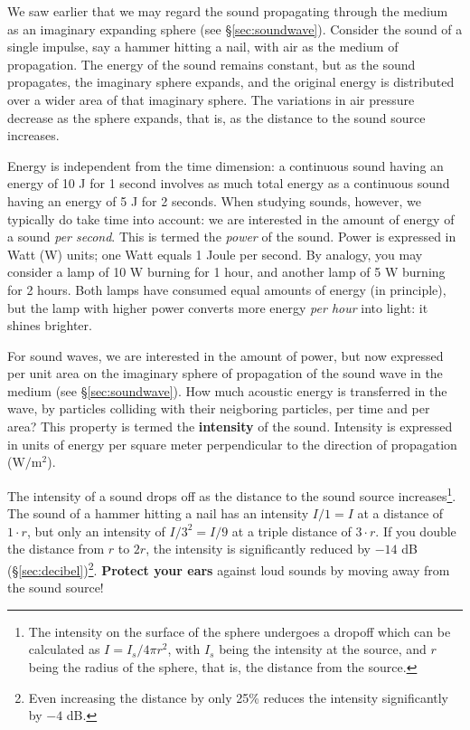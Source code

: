 \documentclass[
]{book}
\begin{document}
We saw earlier that we may regard the sound propagating through the medium as an imaginary expanding sphere (see §\ref{sec:soundwave}). Consider the sound of a single impulse, say a hammer hitting a nail, with air as the medium of propagation. The energy of the sound remains constant, but as the sound propagates, the imaginary sphere expands, and the original energy is distributed over a wider area of that imaginary sphere. The variations in air pressure decrease as the sphere expands, that is, as the distance to the sound source increases.

Energy is independent from the time dimension: a continuous sound having an energy of 10 J for 1 second involves as much total energy as a continuous sound having an energy of 5 J for 2 seconds. When studying sounds, however, we typically do take time into account: we are interested in the amount of energy of a sound \emph{per second}. This is termed the \emph{power} of the sound. Power is expressed in Watt (W) units; one Watt equals 1 Joule per second. By analogy, you may consider a lamp of 10 W burning for 1 hour, and another lamp of 5 W burning for 2 hours. Both lamps have consumed equal amounts of energy (in principle), but the lamp with higher power converts more energy \emph{per hour} into light: it shines brighter.

For sound waves, we are interested in the amount of power, but now expressed per unit area on the imaginary sphere of propagation of the sound wave in the medium (see §\ref{sec:soundwave}). How much acoustic energy is transferred in the wave, by particles colliding with their neigboring particles, per time and per area? This property is termed the \textbf{intensity} of the sound. Intensity is expressed in units of energy per square meter perpendicular to the direction of propagation (\(\textrm{W}/\textrm{m}^2\)).

The intensity of a sound drops off as the distance to the sound source increases\footnote{The intensity on the surface of the sphere undergoes a dropoff which can be calculated as \(I=I_s/4πr^2\), with \(I_s\) being the intensity at the source, and \(r\) being the radius of the sphere, that is, the distance from the source.}. The sound of a hammer hitting a nail has an intensity \(I/1 = I\) at a distance of \(1 \cdot r\), but only an intensity of \(I /3^2 = I/9\) at a triple distance of \(3 \cdot r\). If you double the distance from \(r\) to \(2r\), the intensity is significantly reduced by \(-14\) dB (§\ref{sec:decibel})\footnote{Even increasing the distance by only 25\% reduces the intensity significantly by \(-4\) dB.}. \textbf{Protect your ears} against loud sounds by moving away from the sound source!
\end{document}
